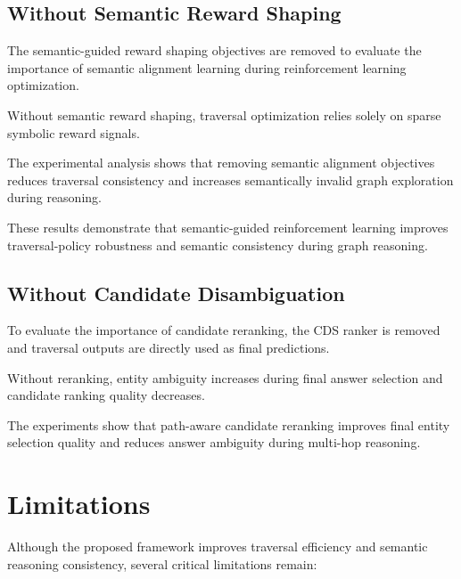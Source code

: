 \documentclass[10pt,conference]{IEEEtran}
\begin{document}
\subsection{Without Semantic Reward Shaping}

The semantic-guided reward shaping objectives are removed to evaluate the importance of semantic alignment learning during reinforcement learning optimization.

Without semantic reward shaping, traversal optimization relies solely on sparse symbolic reward signals.

The experimental analysis shows that removing semantic alignment objectives reduces traversal consistency and increases semantically invalid graph exploration during reasoning.

These results demonstrate that semantic-guided reinforcement learning improves traversal-policy robustness and semantic consistency during graph reasoning.

\subsection{Without Candidate Disambiguation}

To evaluate the importance of candidate reranking, the CDS ranker is removed and traversal outputs are directly used as final predictions.

Without reranking, entity ambiguity increases during final answer selection and candidate ranking quality decreases.

The experiments show that path-aware candidate reranking improves final entity selection quality and reduces answer ambiguity during multi-hop reasoning.


\section{Limitations}
\label{sec:limitations}

Although the proposed framework improves traversal efficiency and semantic reasoning consistency, several critical limitations remain:
\end{document}
